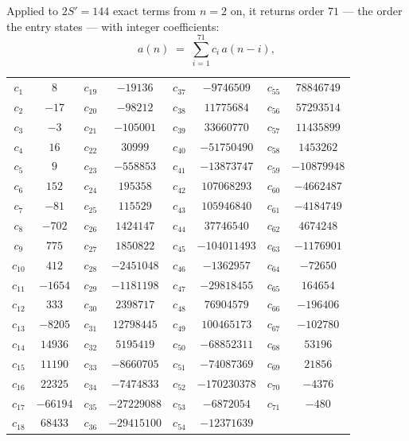 \documentclass[11pt,a4paper]{article}
\theoremstyle{plain}
\theoremstyle{definition}
\begin{document}
Applied to $2S'=144$ exact terms from $n=2$ on, it returns order $71$ --- the
order the entry states --- with integer coefficients:
\[
a(n)\;=\;\sum_{i=1}^{71}c_i\,a(n-i),
\]
\begin{center}\small
\begin{tabular}{cccccccc}
$c_{1}$ & $8$ & $c_{19}$ & $-19136$ & $c_{37}$ & $-9746509$ & $c_{55}$ & $78846749$ \\
$c_{2}$ & $-17$ & $c_{20}$ & $-98212$ & $c_{38}$ & $11775684$ & $c_{56}$ & $57293514$ \\
$c_{3}$ & $-3$ & $c_{21}$ & $-105001$ & $c_{39}$ & $33660770$ & $c_{57}$ & $11435899$ \\
$c_{4}$ & $16$ & $c_{22}$ & $30999$ & $c_{40}$ & $-51750490$ & $c_{58}$ & $1453262$ \\
$c_{5}$ & $9$ & $c_{23}$ & $-558853$ & $c_{41}$ & $-13873747$ & $c_{59}$ & $-10879948$ \\
$c_{6}$ & $152$ & $c_{24}$ & $195358$ & $c_{42}$ & $107068293$ & $c_{60}$ & $-4662487$ \\
$c_{7}$ & $-81$ & $c_{25}$ & $115529$ & $c_{43}$ & $105946840$ & $c_{61}$ & $-4184749$ \\
$c_{8}$ & $-702$ & $c_{26}$ & $1424147$ & $c_{44}$ & $37746540$ & $c_{62}$ & $4674248$ \\
$c_{9}$ & $775$ & $c_{27}$ & $1850822$ & $c_{45}$ & $-104011493$ & $c_{63}$ & $-1176901$ \\
$c_{10}$ & $412$ & $c_{28}$ & $-2451048$ & $c_{46}$ & $-1362957$ & $c_{64}$ & $-72650$ \\
$c_{11}$ & $-1654$ & $c_{29}$ & $-1181198$ & $c_{47}$ & $-29818455$ & $c_{65}$ & $164654$ \\
$c_{12}$ & $333$ & $c_{30}$ & $2398717$ & $c_{48}$ & $76904579$ & $c_{66}$ & $-196406$ \\
$c_{13}$ & $-8205$ & $c_{31}$ & $12798445$ & $c_{49}$ & $100465173$ & $c_{67}$ & $-102780$ \\
$c_{14}$ & $14936$ & $c_{32}$ & $5195419$ & $c_{50}$ & $-68852311$ & $c_{68}$ & $53196$ \\
$c_{15}$ & $11190$ & $c_{33}$ & $-8660705$ & $c_{51}$ & $-74087369$ & $c_{69}$ & $21856$ \\
$c_{16}$ & $22325$ & $c_{34}$ & $-7474833$ & $c_{52}$ & $-170230378$ & $c_{70}$ & $-4376$ \\
$c_{17}$ & $-66194$ & $c_{35}$ & $-27229088$ & $c_{53}$ & $-6872054$ & $c_{71}$ & $-480$ \\
$c_{18}$ & $68433$ & $c_{36}$ & $-29415100$ & $c_{54}$ & $-12371639$ &  &  \\
\end{tabular}
\end{center}
\end{document}
